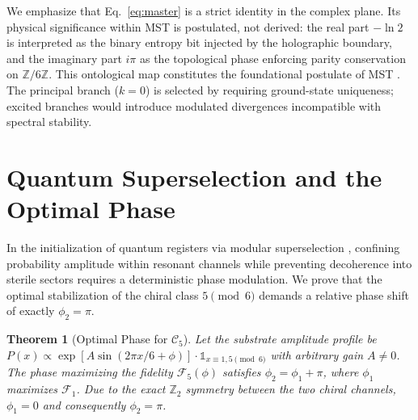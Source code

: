 \documentclass[aps,pra,twocolumn,10pt,superscriptaddress]{revtex4-2}
\newtheorem{theorem}{Theorem}
\newcommand{\Zmod}{\mathbb{Z}/6\mathbb{Z}}
\begin{document}
We emphasize that Eq.~\eqref{eq:master} is a strict identity in the complex plane. Its physical significance within MST is postulated, not derived: the real part $-\ln 2$ is interpreted as the binary entropy bit injected by the holographic boundary, and the imaginary part $i\pi$ as the topological phase enforcing parity conservation on $\Zmod$. This ontological map constitutes the foundational postulate of MST \cite{PeinadorGenesis}. The principal branch ($k=0$) is selected by requiring ground-state uniqueness; excited branches would introduce modulated divergences incompatible with spectral stability.

\section{Quantum Superselection and the Optimal Phase}
\label{sec:superselection}

In the initialization of quantum registers via modular superselection \cite{PeinadorTopologico}, confining probability amplitude within resonant channels while preventing decoherence into sterile sectors requires a deterministic phase modulation. We prove that the optimal stabilization of the chiral class $5 \pmod 6$ demands a relative phase shift of exactly $\phi_2 = \pi$.

\begin{theorem}[Optimal Phase for $\mathcal{C}_5$]
\label{thm:phi2}
Let the substrate amplitude profile be $P(x) \propto \exp[A\sin(2\pi x/6 + \phi)] \cdot \mathds{1}_{x \equiv 1,5 \pmod{6}}$ with arbitrary gain $A \neq 0$. The phase maximizing the fidelity $\mathcal{F}_5(\phi)$ satisfies $\phi_2 = \phi_1 + \pi$, where $\phi_1$ maximizes $\mathcal{F}_1$. Due to the exact $\mathbb{Z}_2$ symmetry between the two chiral channels, $\phi_1 = 0$ and consequently $\phi_2 = \pi$.
\end{theorem}
\end{document}

